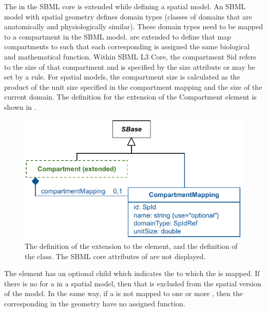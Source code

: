 The \Compartment in the SBML core is extended while defining a spatial model. An SBML model with spatial geometry defines domain types (classes of domains that are anatomically and physiologically similar). These domain types need to be mapped to a compartment in the SBML model. \Compartments are extended to define \CompartmentMappings that map compartments to \DomainTypes such that each corresponding \DomainType is assigned the same biological and mathematical function. Within SBML L3 Core, the compartment Sid refers to the size of that compartment and is specified by the size attribute or may be set by a rule.  For spatial models, the compartment size is calculated as the product of the unit size specified in the compartment mapping and the size of the current domain. The definition for the extension of the Compartment element is shown in .
 
\begin{figure}[ht]
  \includegraphics{figs/extended-compartment-uml}
  \caption{The definition of the extension to the \Compartment element, and the definition of the \CompartmentMapping class. The SBML core attributes of \Compartment are not displayed.}
  \label{compartment-uml}
  \label{CompartmentMapping-uml}
\end{figure}



The \Compartment element has an optional \CompartmentMapping child which indicates the \DomainType to which the \Compartment is mapped.  If there is no \CompartmentMapping for a \Compartment in a spatial model, then that \Compartment is excluded from the spatial version of the model.  In the same way, if a \DomainType is not mapped to one or more \Compartments, then the corresponding \Domains in the geometry have no assigned function.


